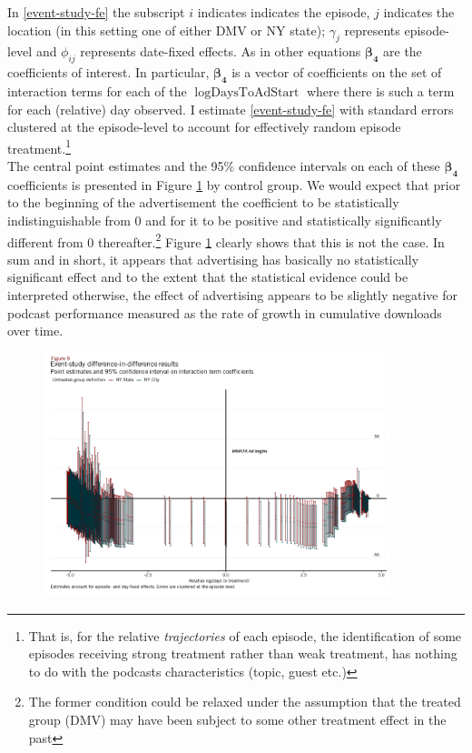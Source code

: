 \documentclass[11pt, letterpaper, twoside]{article}
\begin{document}
In \eqref{event-study-fe} the subscript $i$ indicates indicates the episode, $j$ indicates the location (in this setting one of either DMV or NY state); $\gamma_{j}$ represents episode-level and $\phi_{ij}$ represents date-fixed effects. As in other equations $\mathbf{\beta_4}$ are the coefficients of interest. In particular, $\mathbf{\beta_4}$ is a vector of coefficients on the set of interaction terms for each of the $\log{\text{DaysToAdStart}}$ where there is such a term for each (relative) day observed. I estimate \eqref{event-study-fe} with standard errors clustered at the episode-level to account for effectively random episode treatment.\footnote{That is, for the relative \textit{trajectories} of each episode, the identification of some episodes receiving strong treatment rather than weak treatment, has nothing to do with the podcasts characteristics (topic, guest etc.)}\\

The central point estimates and the 95\% confidence intervals on each of these $\mathbf{\beta_4}$ coefficients is presented in Figure \ref{fig:interaction-term-coefficients} by control group. We would expect that prior to the beginning of the advertisement the coefficient to be statistically indistinguishable from 0 and for it to be positive and statistically significantly different from 0 thereafter.\footnote{The former condition could be relaxed under the assumption that the treated group (DMV) may have been subject to some other treatment effect in the past} Figure \ref{fig:interaction-term-coefficients} clearly shows that this is not the case. In sum and in short, it appears that advertising has basically no statistically significant effect and to the extent that the statistical evidence could be interpreted otherwise, the effect of advertising appears to be slightly negative for podcast performance measured as the rate of growth in cumulative downloads over time.

\begin{figure}[!bht]
  \centering
  \includegraphics[width=0.9\textwidth]{figures/interaction_term_event_study_plot.png}
  \label{fig:interaction-term-coefficients}
\end{figure}
\end{document}
